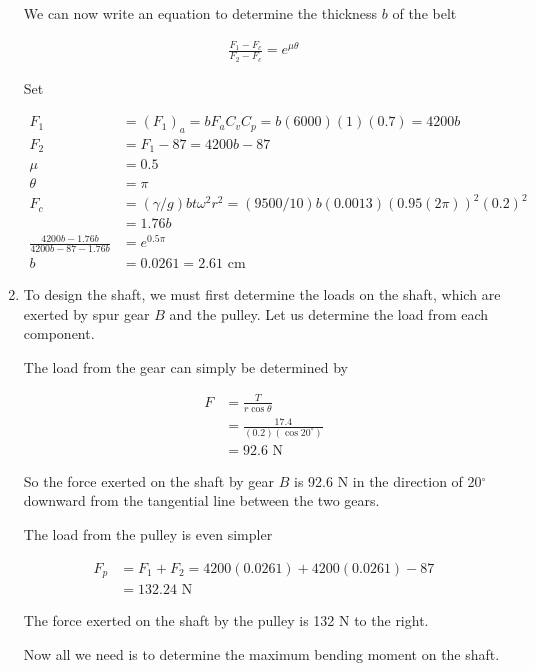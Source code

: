 \documentclass[a4paper,openany]{tufte-book}
\begin{document}
\begin{enumerate}
We can now write an equation to determine the thickness \(b\) of the belt

\begin{align*}
  \frac{F_{1} - F_{c}}{F_{2} - F_{c}} = e^{\mu \theta}
\end{align*}

Set

\begin{align*}
     F_{1} &= (F_{1})_{a} = bF_{a}C_{v}C_{p} = b(6000)(1)(0.7) = 4200b \\
     F_{2} &= F_{1} - 87 = 4200b - 87 \\
     \mu &= 0.5 \\
     \theta &= \pi \\
     F_{c} &= (\gamma/g)bt \omega^{2} r^{2} = (9500/10)b(0.0013)(0.95(2\pi))^{2}(0.2)^{2} \\
        &= 1.76b \\
     \frac{4200b - 1.76b}{4200b - 87 - 1.76b} &= e^{0.5 \pi} \\
     b &= 0.0261 = 2.61 \text{ cm}
   \end{align*}

\item To design the shaft, we must first determine the loads on the shaft, which are exerted by spur gear \(B\) and the pulley. Let us determine the load from each component.

The load from the gear can simply be determined by

\begin{align*}
     F &= \frac{T}{r \cos \theta} \\
       &= \frac{17.4}{(0.2)(\cos 20^{\circ})} \\
       &= 92.6 \text{ N}
   \end{align*}

So the force exerted on the shaft by gear \(B\) is 92.6 N in the direction of 20\(^{\circ}\) downward from the tangential line between the two gears.

The load from the pulley is even simpler

\begin{align*}
     F_{p} &= F_{1} + F_{2} = 4200(0.0261) + 4200(0.0261) - 87 \\
           &= 132.24 \text{ N}
   \end{align*}

The force exerted on the shaft by the pulley is 132 N to the right.

Now all we need is to determine the maximum bending moment on the
shaft.


\end{enumerate}
\end{document}
